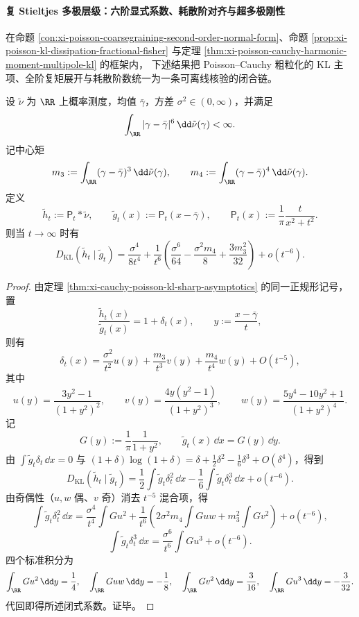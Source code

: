 \paragraph{复 Stieltjes 多极层级：六阶显式系数、耗散阶对齐与超多极刚性}
在命题 \ref{con:xi-poisson-coarsegraining-second-order-normal-form}、命题 \ref{prop:xi-poisson-kl-dissipation-fractional-fisher} 与定理 \ref{thm:xi-poisson-cauchy-harmonic-moment-multipole-kl} 的框架内，
下述结果把 Poisson--Cauchy 粗粒化的 KL 主项、全阶复矩展开与耗散阶数统一为一条可离线核验的闭合链。

\begin{theorem}[KL 二项锐渐近的六次系数闭式]\label{thm:xi-poisson-cauchy-kl-two-term-explicit-coeff}
设 \(\tilde\nu\) 为 \(\RR\) 上概率测度，均值 \(\bar\gamma\)，方差 \(\sigma^2\in(0,\infty)\)，并满足
\[
\int_{\RR}|\gamma-\bar\gamma|^6\,\dd\tilde\nu(\gamma)<\infty.
\]
记中心矩
\[
m_3:=\int_{\RR}(\gamma-\bar\gamma)^3\,\dd\tilde\nu(\gamma),\qquad
m_4:=\int_{\RR}(\gamma-\bar\gamma)^4\,\dd\tilde\nu(\gamma).
\]
定义
\[
\tilde h_t:=\mathsf P_t*\tilde\nu,\qquad
\tilde g_t(x):=\mathsf P_t(x-\bar\gamma),\qquad
\mathsf P_t(x):=\frac1\pi\frac{t}{x^2+t^2}.
\]
则当 \(t\to\infty\) 时有
\[
\boxed{
D_{\mathrm{KL}}(\tilde h_t\mid \tilde g_t)
=\frac{\sigma^4}{8t^4}
+\frac{1}{t^6}\!\left(\frac{\sigma^6}{64}-\frac{\sigma^2m_4}{8}+\frac{3m_3^2}{32}\right)
+o(t^{-6}).}
\]
\end{theorem}
\begin{proof}
由定理 \ref{thm:xi-cauchy-poisson-kl-sharp-asymptotics} 的同一正规形记号，置
\[
\frac{\tilde h_t(x)}{\tilde g_t(x)}=1+\delta_t(x),\qquad
y:=\frac{x-\bar\gamma}{t},
\]
则有
\[
\delta_t(x)
=\frac{\sigma^2}{t^2}u(y)+\frac{m_3}{t^3}v(y)+\frac{m_4}{t^4}w(y)+O(t^{-5}),
\]
其中
\[
u(y)=\frac{3y^2-1}{(1+y^2)^2},\qquad
v(y)=\frac{4y(y^2-1)}{(1+y^2)^3},\qquad
w(y)=\frac{5y^4-10y^2+1}{(1+y^2)^4}.
\]
记
\[
G(y):=\frac1\pi\frac{1}{1+y^2},\qquad \tilde g_t(x)\,\dd x=G(y)\,\dd y.
\]
由 \(\int \tilde g_t\delta_t\,\dd x=0\) 与
\(
(1+\delta)\log(1+\delta)=\delta+\frac12\delta^2-\frac16\delta^3+O(\delta^4)
\)，得到
\[
D_{\mathrm{KL}}(\tilde h_t\mid\tilde g_t)
=\frac12\int \tilde g_t\delta_t^2\,\dd x
-\frac16\int \tilde g_t\delta_t^3\,\dd x
+o(t^{-6}).
\]
由奇偶性（\(u,w\) 偶、\(v\) 奇）消去 \(t^{-5}\) 混合项，得
\[
\int \tilde g_t\delta_t^2\,\dd x
=\frac{\sigma^4}{t^4}\!\int Gu^2
+\frac{1}{t^6}\!\left(2\sigma^2m_4\!\int Guw+m_3^2\!\int Gv^2\right)+o(t^{-6}),
\]
\[
\int \tilde g_t\delta_t^3\,\dd x
=\frac{\sigma^6}{t^6}\!\int Gu^3+o(t^{-6}).
\]
四个标准积分为
\[
\int_{\RR}Gu^2\,\dd y=\frac14,\quad
\int_{\RR}Guw\,\dd y=-\frac18,\quad
\int_{\RR}Gv^2\,\dd y=\frac{3}{16},\quad
\int_{\RR}Gu^3\,\dd y=-\frac{3}{32}.
\]
代回即得所述闭式系数。证毕。
\end{proof}

